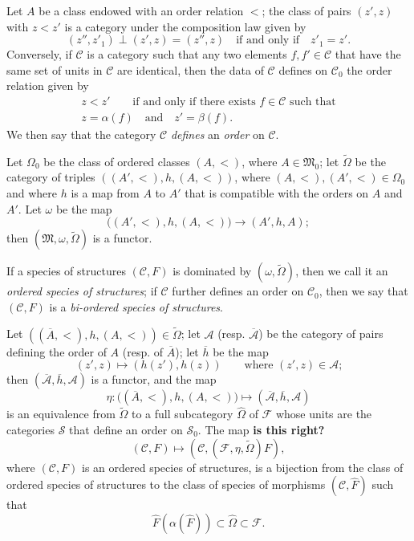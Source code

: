 \documentclass[a4paper,fleqn]{article}
\theoremstyle{plain}
\theoremstyle{definition}
\newenvironment{definition}[1]
  {\renewcommand\theinnerdefinition{#1}\innerdefinition}
  {\endinnerdefinition}
\newcommand{\oldpage}[1]{{\marginpar{\footnotesize$\bigg\vert$\,\,\,\,\textit{p.~#1}}}}
\newcommand{\unsure}[1]{{\color{purple}\textbf{#1}}}
\newcommand{\textand}{\quad\text{and}\quad}
\newcommand{\CC}{\mathcal{C}}
\renewcommand{\SS}{\mathcal{S}}
\newcommand{\MM}{\mathfrak{M}}
\newcommand{\FF}{\mathcal{F}}
\renewcommand{\AA}{\mathcal{A}}
\begin{document}
Let $A$ be a class endowed with an order relation $<$;
the class of pairs $(z',z)$ with $z<z'$ is a category under the composition law given by
\[
  (z'',z'_1)\perp(z',z)
  =(z'',z)
  \quad\text{if and only if}\quad
  z'_1=z'.
\]
\oldpage{356}
Conversely, if $\CC$ is a category such that any two elements $f,f'\in\CC$ that have the same set of units in $\CC$ are identical, then the data of $\CC$ defines on $\CC_0$ the order relation given by
\[
  \begin{gathered}
    z<z'
    \qquad\text{if and only if there exists $f\in\CC$ such that}
  \\z=\alpha(f)
    \textand
    z'=\beta(f).
  \end{gathered}
\]
We then say that the category $\CC$ \emph{defines} an \emph{order} on $\CC$.

Let $\Omega_0$ be the class of ordered classes $(A,<)$, where $A\in\MM_0$;
let $\widetilde{\Omega}$ be the category of triples $((A',<),h,(A,<))$, where $(A,<),(A',<)\in\Omega_0$ and where $h$ is a map from $A$ to $A'$ that is compatible with the orders on $A$ and $A'$.
Let $\omega$ be the map
\[
  \big((A',<),h,(A,<)\big)
  \longrightarrow (A',h,A);
\]
then $(\MM,\omega,\widetilde{\Omega})$ is a functor.

\begin{definition}{5}
\label{definition:i-5}
  If a species of structures $(\CC,F)$ is dominated by $(\omega,\widetilde{\Omega})$, then we call it an \emph{ordered species of structures};
  if $\CC$ further defines an order on $\CC_0$, then we say that $(\CC,F)$ is a \emph{bi-ordered species of structures}.
\end{definition}

Let $((\overline{A},<),h,(A,<))\in\widetilde{\Omega}$;
let $\AA$ (resp. $\overline{\AA}$) be the category of pairs defining the order of $A$ (resp. of $\overline{A}$);
let $\overline{h}$ be the map
\[
  (z',z)
  \longmapsto(h(z'),h(z))
  \qquad\text{where $(z',z)\in\AA$;}
\]
then $(\overline{\AA},\overline{h},\AA)$ is a functor, and the map
\[
  \eta\colon\big((\overline{A},<),h,(A,<)\big)
  \longmapsto(\overline{\AA},\overline{h},\AA)
\]
is an equivalence from $\widetilde{\Omega}$ to a full subcategory $\widehat{\Omega}$ of $\FF$ whose units are the categories $\SS$ that define an order on $\SS_0$.
The map \unsure{is this right?}
\[
  (\CC,F)
  \longmapsto (\CC,(\FF,\eta,\widetilde{\Omega})F),
\]
where $(\CC,F)$ is an ordered species of structures, is a bijection from the class of ordered species of structures to the class of species of morphisms $(\CC,\widehat{F})$ such that
\[
  \widehat{F}(\alpha(\widehat{F}))
  \subset \widehat{\Omega}
  \subset \FF.
\]
\end{document}
